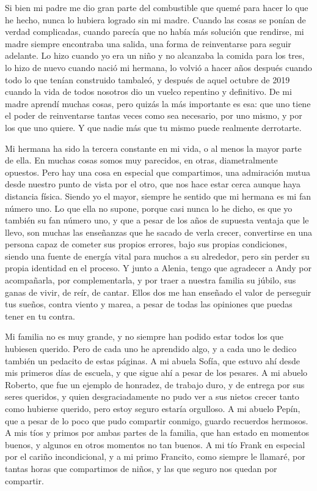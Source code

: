 Si bien mi padre me dio gran parte del combustible que quemé para hacer lo que he hecho, nunca lo hubiera logrado sin mi madre.
Cuando las cosas se ponían de verdad complicadas, cuando parecía que no había más solución que rendirse, mi madre siempre encontraba una salida, una forma de reinventarse para seguir adelante.
Lo hizo cuando yo era un niño y no alcanzaba la comida para los tres, lo hizo de nuevo cuando nació mi hermana, lo volvió a hacer años después cuando todo lo que tenían construido tambaleó, y después de aquel octubre de 2019 cuando la vida de todos nosotros dio un vuelco repentino y definitivo.
De mi madre aprendí muchas cosas, pero quizás la más importante es esa: que uno tiene el poder de reinventarse tantas veces como sea necesario, por uno mismo, y por los que uno quiere.
Y que nadie más que tu mismo puede realmente derrotarte.

Mi hermana ha sido la tercera constante en mi vida, o al menos la mayor parte de ella.
En muchas cosas somos muy parecidos, en otras, diametralmente opuestos.
Pero hay una cosa en especial que compartimos, una admiración mutua desde nuestro punto de vista por el otro, que nos hace estar cerca aunque haya distancia física.
Siendo yo el mayor, siempre he sentido que mi hermana es mi fan número uno.
Lo que ella no supone, porque casi nunca lo he dicho, es que yo también su fan número uno, y que a pesar de los años de supuesta ventaja que le llevo, son muchas las enseñanzas que he sacado de verla crecer, convertirse en una persona capaz de cometer sus propios errores, bajo sus propias condiciones, siendo una fuente de energía vital para muchos a su alrededor, pero sin perder su propia identidad en el proceso.
Y junto a Alenia, tengo que agradecer a Andy por acompañarla, por complementarla, y por traer a nuestra familia su júbilo, sus ganas de vivir, de reír, de cantar.
Ellos dos me han enseñado el valor de perseguir tus sueños, contra viento y marea, a pesar de todas las opiniones que puedas tener en tu contra.

Mi familia no es muy grande, y no siempre han podido estar todos los que hubiesen querido. Pero de cada uno he aprendido algo, y a cada uno le dedico también un pedacito de estas páginas.
A mi abuela Sofía, que estuvo ahí desde mis primeros días de escuela, y que sigue ahí a pesar de los pesares.
A mi abuelo Roberto, que fue un ejemplo de honradez, de trabajo duro, y de entrega por sus seres queridos, y quien desgraciadamente no pudo ver a sus nietos crecer tanto como hubierse querido, pero estoy seguro estaría orgulloso.
A mi abuelo Pepín, que a pesar de lo poco que pudo compartir conmigo, guardo recuerdos hermosos. A mis tíos y primos por ambas partes de la familia, que han estado en momentos buenos, y algunos en otros momentos no tan buenos.
A mi tío Frank en especial por el cariño incondicional, y a mi primo Francito, como siempre le llamaré, por tantas horas que compartimos de niños, y las que seguro nos quedan por compartir.

